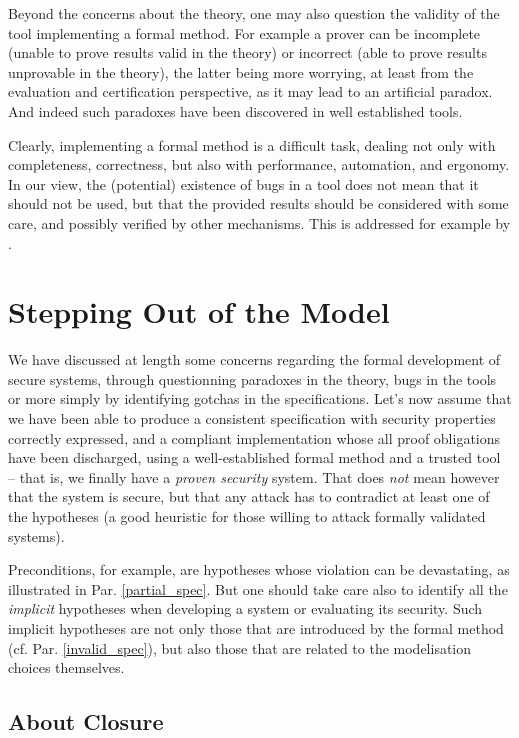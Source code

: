 \documentclass[conference]{IEEEtran}
\begin{document}
Beyond the concerns about the theory, one may also question the validity of the tool
implementing a formal method. For example a prover can be incomplete (unable to prove results
valid in the theory) or incorrect (able to prove results unprovable in the theory), the latter
being more worrying, at least from the evaluation and certification perspective, as it may
lead to an artificial paradox. And indeed such paradoxes have been discovered in well
established tools.

Clearly, implementing a formal method is a difficult task, dealing not only with completeness,
correctness, but also with performance, automation, and ergonomy. In our view, the (potential)
existence of bugs in a tool does not mean that it should not be used, but that the provided
results should be considered with some care, and possibly verified by other mechanisms. This
is addressed for example by \cite{DBLP:conf/lpar/JaegerD07,rid:1}.

\section{Stepping Out of the Model}\label{stepping_out}

We have discussed at length some concerns regarding the formal development of secure systems,
through questionning paradoxes in the theory, bugs in the tools or more simply by identifying
gotchas in the specifications. Let's now assume that we have been able to produce a consistent
specification with security properties correctly expressed, and a compliant implementation
whose all proof obligations have been discharged, using a well-established formal method and a
trusted tool -- that is, we finally have a \emph{proven security} system. That does \emph{not}
mean however that the system is secure, but that any attack has to contradict at least one of
the hypotheses (a good heuristic for those willing to attack formally validated systems).

Preconditions, for example, are hypotheses whose violation can be devastating, as illustrated
in Par. \ref{partial_spec}. But one should take care also to identify all the \emph{implicit}
hypotheses when developing a system or evaluating its security. Such implicit hypotheses are
not only those that are introduced by the formal method (cf. Par. \ref{invalid_spec}), but
also those that are related to the modelisation choices themselves.

\subsection{About Closure}\label{closure}
\end{document}
